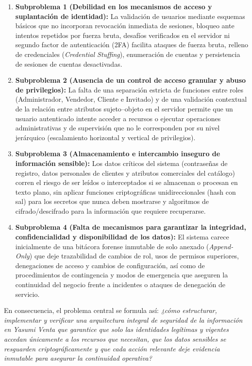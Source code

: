 \documentclass[12pt,letterpaper]{article}
\begin{document}
\begin{enumerate}
  \item \textbf{Subproblema 1 (Debilidad en los mecanismos de acceso y suplantación de identidad):} La validación de usuarios mediante esquemas básicos que no incorporan revocación inmediata de sesiones, bloqueo ante intentos repetidos por fuerza bruta, desafíos verificados en el servidor ni segundo factor de autenticación (2FA) facilita ataques de fuerza bruta, relleno de credenciales (\emph{Credential Stuffing}), enumeración de cuentas y persistencia de sesiones de cuentas desactivadas.
  \item \textbf{Subproblema 2 (Ausencia de un control de acceso granular y abuso de privilegios):} La falta de una separación estricta de funciones entre roles (Administrador, Vendedor, Cliente e Invitado) y de una validación contextual de la relación entre atributos sujeto--objeto en el servidor permite que un usuario autenticado intente acceder a recursos o ejecutar operaciones administrativas y de supervisión que no le corresponden por su nivel jerárquico (escalamiento horizontal y vertical de privilegios).
  \item \textbf{Subproblema 3 (Almacenamiento e intercambio inseguro de información sensible):} Los datos críticos del sistema (contraseñas de registro, datos personales de clientes y atributos comerciales del catálogo) corren el riesgo de ser leídos o interceptados si se almacenan o procesan en texto plano, sin aplicar funciones criptográficas unidireccionales (hash con sal) para los secretos que nunca deben mostrarse y algoritmos de cifrado/descifrado para la información que requiere recuperarse.
  \item \textbf{Subproblema 4 (Falta de mecanismos para garantizar la integridad, confidencialidad y disponibilidad de los datos):} El sistema carece inicialmente de una bitácora forense inmutable de solo anexado (\emph{Append-Only}) que deje trazabilidad de cambios de rol, usos de permisos superiores, denegaciones de acceso y cambios de configuración, así como de procedimientos de contingencia y modos de emergencia que aseguren la continuidad del negocio frente a incidentes o ataques de denegación de servicio.
\end{enumerate}

En consecuencia, el problema central se formula así: \textit{¿cómo estructurar, implementar y verificar una arquitectura integral de seguridad de la información en Yasumi Venta que garantice que solo las identidades legítimas y vigentes accedan únicamente a los recursos que necesitan, que los datos sensibles se resguarden criptográficamente y que cada acción relevante deje evidencia inmutable para asegurar la continuidad operativa?}
\end{document}
